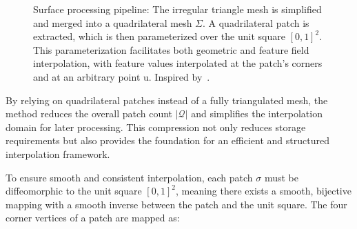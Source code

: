 \begin{figure}[ht]
\begin{adjustbox}{center}
  \end{adjustbox}
  \caption{Surface processing pipeline: The irregular triangle mesh is simplified and merged into a quadrilateral mesh $\Sigma$. A quadrilateral patch is extracted, which is then parameterized over the unit square $[0,1]^2$. This parameterization facilitates both geometric and feature field interpolation, with feature values interpolated at the patch's corners and at an arbitrary point u. Inspired by~\cite{sivaram2024}.}
  \label{fig:surface_processing_pipeline}
\end{figure}
By relying on quadrilateral patches instead of a fully triangulated mesh, the method reduces the overall patch count $|\mathcal{Q}|$ and simplifies the interpolation domain for later processing.  
This compression not only reduces storage requirements but also provides the foundation for an efficient and structured interpolation framework.  

To ensure smooth and consistent interpolation, each patch $\sigma$ must be diffeomorphic to the unit square $[0,1]^2$, meaning there exists a smooth, bijective mapping with a smooth inverse between the patch and the unit square.  
The four corner vertices of a patch are mapped as:

